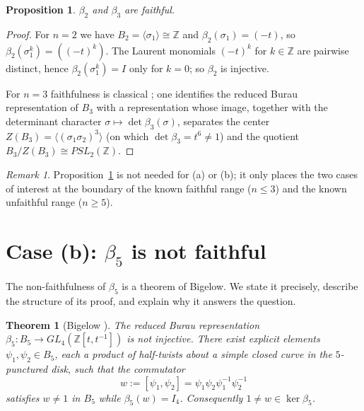 \documentclass{amsart}
\newtheorem{theorem}{Theorem}
\newtheorem{proposition}{Proposition}
\theoremstyle{remark}
\newtheorem{remark}{Remark}
\begin{document}
\begin{proposition}\label{prop:small}
$\beta_2$ and $\beta_3$ are faithful.
\end{proposition}

\begin{proof}
For $n=2$ we have $B_2=\langle\sigma_1\rangle\cong\mathbb Z$ and
$\beta_2(\sigma_1)=(-t)$, so $\beta_2(\sigma_1^k)=((-t)^k)$. The Laurent
monomials $(-t)^k$ for $k\in\mathbb Z$ are pairwise distinct, hence
$\beta_2(\sigma_1^k)=I$ only for $k=0$; so $\beta_2$ is injective.

For $n=3$ faithfulness is classical \cite[Thm.~3.15 and \S3.3]{KasselTuraev};
one identifies the reduced Burau representation of $B_3$ with a representation
whose image, together with the determinant character
$\sigma\mapsto\det\beta_3(\sigma)$, separates the center
$Z(B_3)=\langle(\sigma_1\sigma_2)^3\rangle$ (on which
$\det\beta_3=t^{6}\ne1$) and the quotient $B_3/Z(B_3)\cong PSL_2(\mathbb Z)$.
\end{proof}

\begin{remark}
Proposition~\ref{prop:small} is not needed for (a) or (b); it only places the
two cases of interest at the boundary of the known faithful range ($n\le3$) and
the known unfaithful range ($n\ge5$).
\end{remark}

\section{Case (b): $\beta_5$ is not faithful}

The non-faithfulness of $\beta_5$ is a theorem of Bigelow. We state it
precisely, describe the structure of its proof, and explain why it answers the
question.

\begin{theorem}[Bigelow {\cite[Theorem]{Bigelow1999}}]\label{thm:bigelow}
The reduced Burau representation $\beta_5:B_5\to GL_4(\mathbb Z[t,t^{-1}])$ is
not injective. There exist explicit elements $\psi_1,\psi_2\in B_5$, each a
product of half-twists about a simple closed curve in the $5$-punctured disk,
such that the commutator
\begin{equation}\label{eq:ker}
w:=[\psi_1,\psi_2]=\psi_1\psi_2\psi_1^{-1}\psi_2^{-1}
\end{equation}
satisfies $w\ne 1$ in $B_5$ while $\beta_5(w)=I_4$. Consequently
$1\ne w\in\ker\beta_5$.
\end{theorem}
\end{document}
